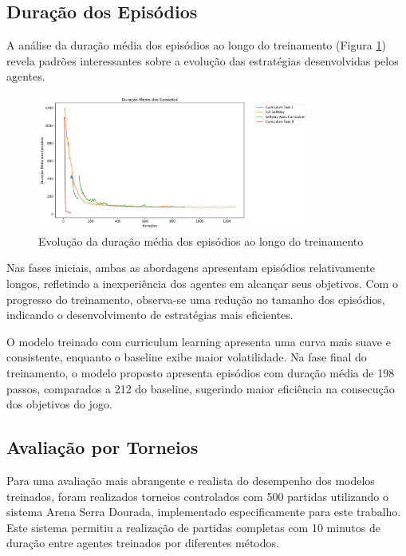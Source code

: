 \subsection{Duração dos Episódios}

A análise da duração média dos episódios ao longo do treinamento (Figura \ref{fig:episode_len}) revela padrões interessantes sobre a evolução das estratégias desenvolvidas pelos agentes.

\begin{figure}[H]
    \centering
    \includegraphics[width=0.8\textwidth]{fig/graficos_trabalho/graficos_experimentos/geral/episode_len_mean.png}
    \caption{Evolução da duração média dos episódios ao longo do treinamento}
    \label{fig:episode_len}
\end{figure}

Nas fases iniciais, ambas as abordagens apresentam episódios relativamente longos, refletindo a inexperiência dos agentes em alcançar seus objetivos. Com o progresso do treinamento, observa-se uma redução no tamanho dos episódios, indicando o desenvolvimento de estratégias mais eficientes.

O modelo treinado com curriculum learning apresenta uma curva mais suave e consistente, enquanto o baseline exibe maior volatilidade. Na fase final do treinamento, o modelo proposto apresenta episódios com duração média de 198 passos, comparados a 212 do baseline, sugerindo maior eficiência na consecução dos objetivos do jogo.

\subsection{Avaliação por Torneios}

Para uma avaliação mais abrangente e realista do desempenho dos modelos treinados, foram realizados torneios controlados com 500 partidas utilizando o sistema Arena Serra Dourada, implementado especificamente para este trabalho. Este sistema permitiu a realização de partidas completas com 10 minutos de duração entre agentes treinados por diferentes métodos.

